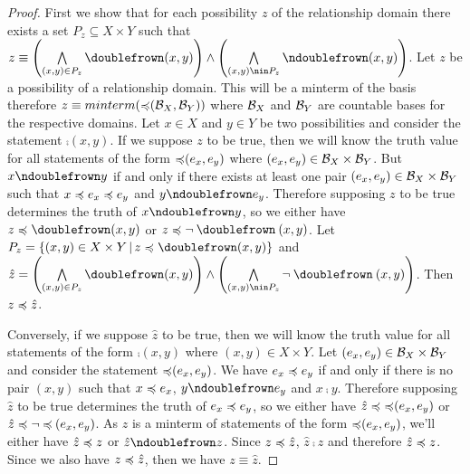 \documentclass[11pt,letterpaper,fleqn]{memoir} %
\begin{document}
\begin{mathSection}
\begin{proof}
	First we show that for each possibility $z$ of the relationship domain there exists a set $P_z \subseteq X \times Y$ such that $z \equiv \left( \bigAND\limits_{(x,y) \in P_z} \mathbin{\comp}(x, y) \right) \AND \left( \bigAND\limits_{(x,y) \nin P_z} \mathbin{\ncomp}(x, y) \right)$. Let $z$ be a possibility of a relationship domain. This will be a minterm of the basis therefore $z \equiv minterm(\mathbin{\preccurlyeq}(\mathcal{B}_X, \mathcal{B}_Y))$ where $\mathcal{B}_X$ and $\mathcal{B}_Y$ are countable bases for the respective domains. Let $x \in X$ and $y \in Y$ be two possibilities and consider the statement $\mathbin{\comp}(x,y)$. If we suppose $z$ to be true, then we will know the truth value for all statements of the form $\mathbin{\preccurlyeq}(e_x, e_y)$ where $(e_x, e_y) \in \mathcal{B}_X \times \mathcal{B}_Y$. But $x \ncomp y$ if and only if there exists at least one pair $(e_x, e_y) \in \mathcal{B}_X \times \mathcal{B}_Y$ such that $x \preccurlyeq e_x \preccurlyeq e_y$ and $y \ncomp e_y$. Therefore supposing $z$ to be true determines the truth of $x \ncomp y$, so we either have $z \narrower \mathbin{\comp}(x,y)$ or $z \narrower \NOT \mathbin{\comp}(x,y)$. Let $P_z = \{ (x,y) \in X \times Y \, | \, z \narrower \mathbin{\comp}(x,y) \}$ and $\hat{z} = \left( \bigAND\limits_{(x,y) \in P_z} \mathbin{\comp}(x, y) \right) \AND \left( \bigAND\limits_{(x,y) \nin P_z} \NOT \mathbin{\comp}(x, y) \right)$. Then $z \preccurlyeq \hat{z}$.
	
	Conversely, if we suppose $\hat{z}$ to be true, then we will know the truth value for all statements of the form $\mathbin{\comp}(x,y)$ where $(x,y) \in X \times Y$. Let $(e_x, e_y) \in \mathcal{B}_X \times \mathcal{B}_Y$ and consider the statement $\mathbin{\preccurlyeq}(e_x, e_y)$. We have $e_x \preccurlyeq e_y$ if and only if there is no pair $(x,y)$ such that $x \preccurlyeq e_x$, $y \ncomp e_y$ and $x \comp y$. Therefore supposing $\hat{z}$ to be true determines the truth of $e_x \preccurlyeq e_y$, so we either have $\hat{z} \preccurlyeq \mathbin{\preccurlyeq}(e_x,e_y)$ or $\hat{z} \preccurlyeq \neg \mathbin{\preccurlyeq}(e_x,e_y)$. As $z$ is a minterm of statements of the form $\mathbin{\preccurlyeq}(e_x, e_y)$, we'll either have $\hat{z} \preccurlyeq z$ or $\hat{z} \ncomp z$. Since $z \preccurlyeq \hat{z}$,  $\hat{z} \comp z$ and therefore $\hat{z} \preccurlyeq z$. Since 
	we also have $z \preccurlyeq \hat{z}$, then we have $z \equiv \hat{z}$.
	

\end{proof}
\end{mathSection}
\end{document}
